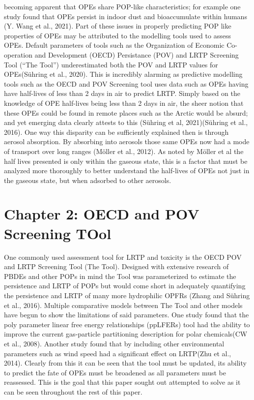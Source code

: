 \documentclass[journal=jacsat,manuscript=article]{achemso}
\begin{document}
becoming apparent that OPEs share POP-like characteristics; for example
one study found that OPEs persist in indoor dust and bioaccumulate
within humans (Y. Wang et al., 2021). Part of these issues in properly
predicting POP like properties of OPEs may be attributed to the
modelling tools used to assess OPEs. Default parameters of tools such as
the Organization of Economic Co-operation and Development (OECD)
Persistance (POV) and LRTP Screening Tool (``The Tool'') underestimated
both the POV and LRTP values for OPEs(Sühring et al., 2020). This is
incredibly alarming as predictive modelling tools such as the OECD and
POV Screening tool uses data such as OPEs having have half-lives of less
than 2 days in air to predict LRTP. Simply based on the knowledge of OPE
half-lives being less than 2 days in air, the sheer notion that these
OPEs could be found in remote places such as the Arctic would be absurd;
and yet emerging data clearly attests to this (Sühring et al,
2021)(Sühring et al., 2016). One way this disparity can be sufficiently
explained then is through aerosol absorption. By absorbing into aerosols
those same OPEs now had a mode of transport over long ranges (Möller et
al., 2012). As noted by Möller et al the half lives presented is only
within the gaseous state, this is a factor that must be analyzed more
thoroughly to better understand the half-lives of OPEs not just in the
gaseous state, but when adsorbed to other aerosols.

\hypertarget{chapter-2-oecd-and-pov-screening-tool}{%
\section{Chapter 2: OECD and POV Screening
TOol}\label{chapter-2-oecd-and-pov-screening-tool}}

One commonly used assessment tool for LRTP and toxicity is the OECD POV
and LRTP Screening Tool (The Tool). Designed with extensive research of
PBDEs and other POPs in mind the Tool was parameterized to estimate the
persistence and LRTP of POPs but would come short in adequately
quantifying the persistence and LRTP of many more hydrophilic OPFRs
(Zhang and Sühring et al., 2016). Multiple comparative models between
The Tool and other models have begun to show the limitations of said
parameters. One study found that the poly parameter linear free energy
relationships (ppLFERs) tool had the ability to improve the current
gas-particle partitioning description for polar chemicals(CW et al.,
2008). Another study found that by including other environmental
parameters such as wind speed had a significant effect on LRTP(Zhu et
al., 2014). Clearly from this it can be seen that the tool must be
updated, its ability to predict the fate of OPEs must be broadened as
all parameters must be reassessed. This is the goal that this paper
sought out attempted to solve as it can be seen throughout the rest of
this paper.
\end{document}
